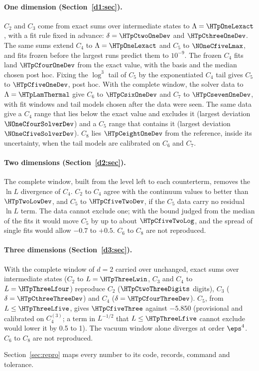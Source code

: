 \paragraph{One dimension (Section~\ref{d1:sec}).} $C_2$ and $C_3$ come from exact sums over intermediate states to
$\Lambda=\HTpOneLexact$, with a fit rule fixed in advance: $\delta=\HTpCtwoOneDev$ and $\HTpCthreeOneDev$. The same
sums extend $C_4$ to $\Lambda=\HTpOneLexact$ and $C_5$ to $\NOneCfiveLmax$, and fits frozen before the largest runs
predict them to $10^{-9}$. The frozen $C_4$ fits land $\HTpCfourOneDev$ from the exact value, with the basis and the
median chosen post hoc. Fixing the $\log^3$ tail of $C_5$ by the exponentiated $C_4$ tail gives $C_5$ to
$\HTpCfiveOneDev$, post hoc. With the complete window, the solver data to $\Lambda=\HTpLamThermal$ give $C_6$ to
$\HTpCsixOneDev$ and $C_7$ to $\HTpCsevenOneDev$, with fit windows and tail models chosen after the data were seen. The
same data give a $C_4$ range that lies below the exact value and excludes it (largest deviation
$\NOneCfourSolverDev$) and a $C_5$ range that contains it (largest deviation $\NOneCfiveSolverDev$). $C_8$ lies $\HTpCeightOneDev$ from the reference, inside its
uncertainty, when the tail models are calibrated on $C_6$ and $C_7$.

\paragraph{Two dimensions (Section~\ref{d2:sec}).} The complete window, built from the level left to each counterterm,
removes the $\ln L$ divergence of $C_4$. $C_2$ to $C_4$ agree with the continuum values to better than
$\HTpTwoLowDev$, and $C_5$ to $\HTpCfiveTwoDev$, if the $C_5$ data carry no residual $\ln L$ term. The data cannot exclude one; with
the bound judged from the median of the fits it would move $C_5$ by up to about $\HTpCfiveTwoLog$, and the spread of
single fits would allow $-0.7$ to $+0.5$. $C_6$ to $C_8$ are not reproduced.

\paragraph{Three dimensions (Section~\ref{d3:sec}).} With the complete window of $d=2$ carried over unchanged, exact sums
over intermediate states ($C_2$ to $L=\HTpThreeLwin$, $C_3$ and $C_4$ to $L=\HTpThreeLfour$) reproduce $C_2$
($\HTpCtwoThreeDigits$ digits), $C_3$ ($\delta=\HTpCthreeThreeDev$) and $C_4$ ($\delta=\HTpCfourThreeDev$). $C_5$, from
$L\le\HTpThreeLfive$, gives $\HTpCfiveThree$ against $-5.850$ (provisional and calibrated on $C_4^{(3)}$; a term in
$L^{-1/2}$ that $L\le\HTpThreeLfive$ cannot exclude would lower it by 0.5 to 1). The vacuum window alone diverges at
order $\eps^4$. $C_6$ to $C_8$ are not reproduced.

Section~\ref{sec:repro} maps every number to its code, records, command and tolerance.
